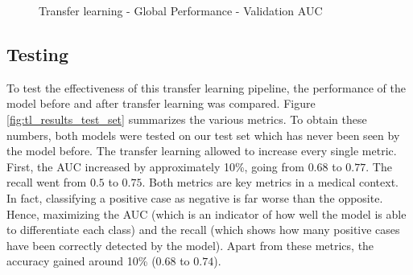 
\begin{figure}[!h]
\centering
\noindent
{}
\caption{Transfer learning - Global Performance - Validation AUC}
\label{fig:tl_global_validation_auc}
\end{figure}


\subsection{Testing}
\setlength{\marginparwidth}{3cm}\leavevmode {}To test the effectiveness of this transfer learning pipeline, the performance of the model before and after transfer learning was compared. Figure \ref{fig:tl_results_test_set} summarizes the various metrics. To obtain these numbers, both models were tested on our test set which has never been seen by the model before. The transfer learning allowed to increase every single metric. First, the AUC increased by approximately 10\%, going from $0.68$ to $0.77$. The recall went from $0.5$ to $0.75$. Both metrics are key metrics in a medical context. In fact, classifying a positive case as negative is far worse than the opposite. Hence, maximizing the AUC (which is an indicator of how well the model is able to differentiate each class) and the recall (which shows how many positive cases have been correctly detected by the model). Apart from these metrics, the accuracy gained around 10\% ($0.68$ to $0.74$). 


